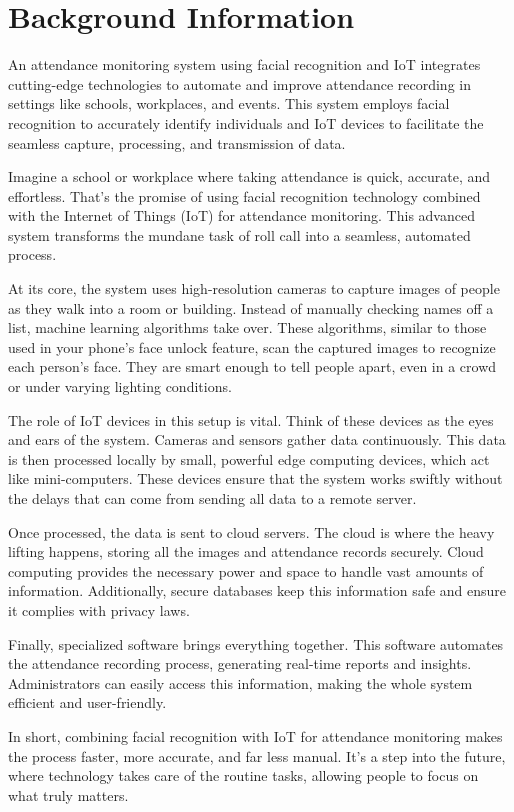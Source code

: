 \documentclass[12pt,a4paper]{report}
\begin{document}
\section{Background Information}
\par An attendance monitoring system using facial recognition and IoT integrates cutting-edge technologies to automate and improve attendance recording in settings like schools, workplaces, and events. This system employs facial recognition to accurately identify individuals and IoT devices to facilitate the seamless capture, processing, and transmission of data.\\
\par Imagine a school or workplace where taking attendance is quick, accurate, and effortless. That's the promise of using facial recognition technology combined with the Internet of Things (IoT) for attendance monitoring. This advanced system transforms the mundane task of roll call into a seamless, automated process.\\
\par At its core, the system uses high-resolution cameras to capture images of people as they walk into a room or building. Instead of manually checking names off a list, machine learning algorithms take over. These algorithms, similar to those used in your phone's face unlock feature, scan the captured images to recognize each person's face. They are smart enough to tell people apart, even in a crowd or under varying lighting conditions.\\
\par The role of IoT devices in this setup is vital. Think of these devices as the eyes and ears of the system. Cameras and sensors gather data continuously. This data is then processed locally by small, powerful edge computing devices, which act like mini-computers. These devices ensure that the system works swiftly without the delays that can come from sending all data to a remote server.\\
\par Once processed, the data is sent to cloud servers. The cloud is where the heavy lifting happens, storing all the images and attendance records securely. Cloud computing provides the necessary power and space to handle vast amounts of information. Additionally, secure databases keep this information safe and ensure it complies with privacy laws.\\
\par Finally, specialized software brings everything together. This software automates the attendance recording process, generating real-time reports and insights. Administrators can easily access this information, making the whole system efficient and user-friendly.\\
\par In short, combining facial recognition with IoT for attendance monitoring makes the process faster, more accurate, and far less manual. It's a step into the future, where technology takes care of the routine tasks, allowing people to focus on what truly matters.
\end{document}
